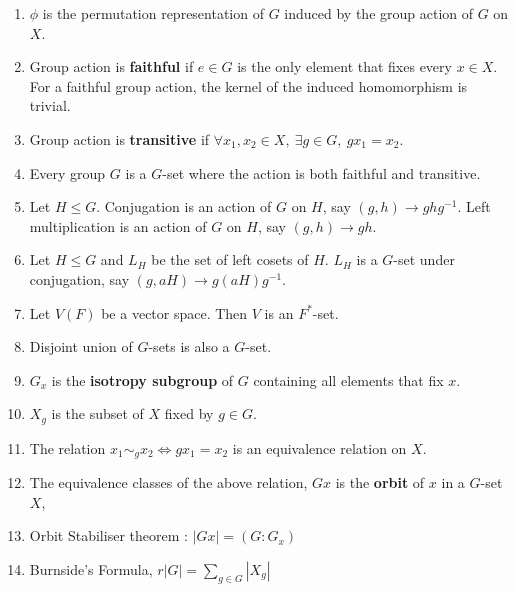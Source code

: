 \begin{enumerate}
	\item $\phi$ is the permutation representation of $G$ induced by the group action of $G$ on $X$.
	\item Group action is \textbf{faithful} if $e \in G$ is the only element that fixes every $x \in X$.
		\subitem For a faithful group action, the kernel of the induced homomorphism is trivial.
	\item Group action is \textbf{transitive} if $\forall x_1,x_2 \in X,\ \exists g \in G,\ gx_1 = x_2$.
	\item Every group $G$ is a $G$-set where the action is both faithful and transitive. 
	\item Let $H \le G$. 
		\subitem Conjugation is an action of $G$ on $H$, say $(g,h) \to ghg^{-1}$. 
		\subitem Left multiplication is an action of $G$ on $H$, say $(g,h) \to gh$. 
	\item Let $H \le G$ and $L_H$ be the set of left cosets of $H$. 
		\subitem $L_H$ is a $G$-set under conjugation, say $(g,aH) \to g(aH)g^{-1}$.
	\item Let $V(F)$ be a vector space. Then $V$ is an $F^\ast$-set.
	\item Disjoint union of $G$-sets is also a $G$-set.
	\item $G_x$ is the \textbf{isotropy subgroup} of $G$ containing all elements that fix $x$.
	\item $X_g$ is the subset of $X$ fixed by $g \in G$.
	\item The relation $x_1 \sim_g x_2 \iff gx_1=x_2$ is an equivalence relation on $X$.
	\item The equivalence classes of the above relation, $Gx$ is the \textbf{orbit} of $x$ in a $G$-set $X$, 
	\item Orbit Stabiliser theorem : $|Gx| = (G:G_x)$
	\item Burnside's Formula, $r |G| = \sum_{g \in G}|X_g|$
\end{enumerate}

